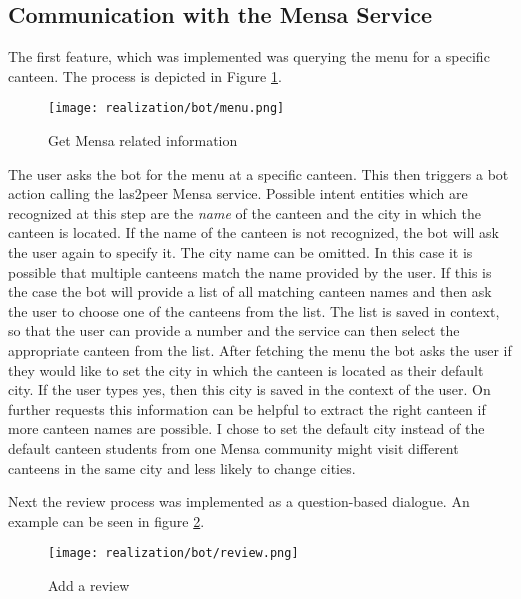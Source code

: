 \subsection{Communication with the Mensa Service}
The first feature, which was implemented was querying the menu for a specific canteen. 
The process is depicted in Figure \ref{fig:getMenu}.
\begin{figure}[h]
    \centering
    \texttt{[image: realization/bot/menu.png]}
    \caption{Get Mensa related information}
    \label{fig:getMenu}
\end{figure}
The user asks the bot for the menu at a specific canteen. 
This then triggers a bot action calling the las2peer Mensa service. 
Possible intent entities which are recognized at this step are the \emph{name} of the canteen and the city in which the canteen is located.
If the name of the canteen is not recognized, the bot will ask  the user again to specify it. The city name can be omitted. In this case it is possible that multiple canteens match the name provided by the user. If this is the case the bot will provide a list of all matching canteen names and then ask the user to choose one of the canteens from the list. The list is saved in context, so that the user can provide a number and the service can then select the appropriate canteen from the list.
After fetching the menu the bot asks the user if they would like to set the city in which the canteen is located as their default city. If the user types yes, then this city is saved in the context of the user. On further requests this information can be helpful to extract the right canteen if more canteen names are possible. 
I chose to set the default city instead of the default canteen students from one Mensa community might visit different canteens in the same city and less likely to change cities. 

Next the review process was implemented as a question-based dialogue. An example can be seen in figure \ref{fig:addReview}.

\begin{figure}[h]
    \centering
    \texttt{[image: realization/bot/review.png]}
    \caption{Add a review}
    \label{fig:addReview}
\end{figure}


